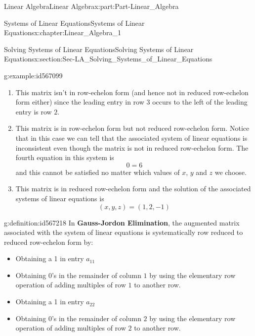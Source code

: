 \documentclass[oneside,10pt,]{book}
\newcommand{\terminology}[1]{\textbf{#1}}
\numberwithin{equation}{section}
\newcommand{\amp}{&}
\begin{document}
\begin{partptx}{Linear Algebra}{}{Linear Algebra}{}{}{x:part:Part-Linear_Algebra}
\begin{chapterptx}{Systems of Linear Equations}{}{Systems of Linear Equations}{}{}{x:chapter:Linear_Algebra_1}
\begin{sectionptx}{Solving Systems of Linear Equations}{}{Solving Systems of Linear Equations}{}{}{x:section:Sec-LA_Solving_Systems_of_Linear_Equations}
\begin{example}{}{g:example:id567099}
\begin{enumerate}[label=(\alph*).]
\begin{align*}
x \amp =2-3z\\
y \amp =-3+z
\end{align*}
Thus this system of equations has an infinite number of solutions given by%
\begin{equation*}
(x,y,z)=(2-3t,-3+t,t)
\end{equation*}
or%
\begin{equation*}
(x,y,z)=(2,-3,0)+t(-3,1,1)
\end{equation*}
%
\item{}This matrix isn’t in row-echelon form (and hence not in reduced row-echelon form either) since the leading entry in row \(3\) occurs to the left of the leading entry is row \(2\).%
\item{}This matrix is in row-echelon form but not reduced row-echelon form. Notice that in this case we can tell that the associated system of linear equations is inconsistent even though the matrix is not in reduced row-echelon form. The fourth equation in this system is%
\begin{equation*}
0=6
\end{equation*}
and this cannot be satisfied no matter which values of \(x\), \(y\) and \(z\) we choose.%
\item{}This matrix is in reduced row-echelon form and the solution of the associated systems of linear equations is%
\begin{equation*}
(x,y,z)=(1,2,-1)
\end{equation*}
%
\end{enumerate}
%
\end{example}
\begin{definition}{}{g:definition:id567218}%
In \terminology{Gauss-Jordon Elimination}, the augmented matrix associated with the system of linear equations is systematically row reduced to reduced row-echelon form by:%
\par
%
\begin{itemize}[label=\textbullet]
\item{}Obtaining a 1 in entry \(a_{11}\)%
\item{}Obtaining \(0\)’s in the remainder of column \(1\) by using the elementary row operation of adding multiples of row \(1\) to another row.%
\item{}Obtaining a 1 in entry \(a_{22}\)%
\item{}Obtaining \(0\)’s in the remainder of column \(2\) by using the elementary row operation of adding multiples of row \(2\) to another row.%

\end{itemize}
\end{definition}
\end{sectionptx}
\end{chapterptx}
\end{partptx}
\end{document}
